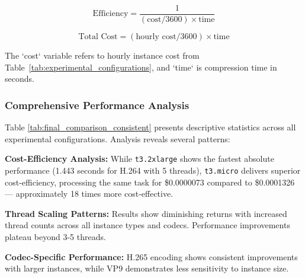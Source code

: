 \documentclass[conference]{IEEEtran}
\begin{document}
	\begin{equation}
		\text{Efficiency} = \frac{1}{(\text{cost}/3600) \times \text{time}}
		\label{eq:efficiency}
	\end{equation}
	
	\begin{equation}
		\text{Total Cost} = (\text{hourly cost}/3600) \times \text{time}
		\label{eq:total_cost}
	\end{equation}
	
	The `cost` variable refers to hourly instance cost from Table~\ref{tab:experimental_configurations}, and `time` is compression time in seconds.
	
	\subsubsection{Comprehensive Performance Analysis}
	
	Table \ref{tab:final_comparison_consistent} presents descriptive statistics across all experimental configurations. Analysis reveals several patterns:
	
	\textbf{Cost-Efficiency Analysis:} While \texttt{t3.2xlarge} shows the fastest absolute performance (1.443 seconds for H.264 with 5 threads), \texttt{t3.micro} delivers superior cost-efficiency, processing the same task for \$0.0000073 compared to \$0.0001326 — approximately 18 times more cost-effective.
	
	\textbf{Thread Scaling Patterns:} Results show diminishing returns with increased thread counts across all instance types and codecs. Performance improvements plateau beyond 3-5 threads.
	
	\textbf{Codec-Specific Performance:} H.265 encoding shows consistent improvements with larger instances, while VP9 demonstrates less sensitivity to instance size.
	
\end{document}
